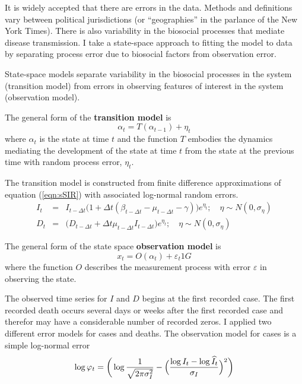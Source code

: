 \documentclass[12pt,letterpaper]{article}
\begin{document}
It is widely accepted that there are errors in the data. Methods and
definitions vary
between political jurisdictions (or ``geographies'' in the parlance of
the New York Times). There is also variability in the biosocial
processes that mediate disease transmission.
I take a state-space approach to fitting the model to data by
separating process error due to biosocial factors from observation
error. 

State-space models separate variability in the biosocial
processes in the system (transition model)
from errors in observing features of interest
in the system (observation model).

The general form of the {\bf transition model} is
\begin{displaymath}
\alpha_t=T(\alpha_{t-1}) + \eta_t
\end{displaymath}
where $\alpha_t$ is the state at time $t$ and 
the function $T$ embodies the dynamics mediating the
development of the state at time $t$ from the state at the previous
time with random process error, $\eta_t$.

The transition model is constructed from finite difference
approximations of equation (\ref{eqn:sSIR}) with associated log-normal
random errors.
\begin{eqnarray}
\label{eqn:sSIRfd}
I_t &=& I_{t-\Delta t}\big(1+\Delta t(\beta_{t-\Delta t} - \mu_{t-\Delta t}
- \gamma)\big)e^{\eta_t} ;\quad\eta\sim N(0,\sigma_\eta) \\ 
D_t &=& \big(D_{t-\Delta t} + \Delta t \mu_{t-\Delta t}I_{t-\Delta
t}\big)e^{\eta_t};\quad\eta\sim N(0,\sigma_\eta)
\end{eqnarray}

The general form of the state space {\bf observation model} is
\begin{displaymath}
x_t = O(\alpha_t) + \varepsilon_t1G
\end{displaymath}
where the function $O$ describes the measurement process with
error $\varepsilon$ in observing the state.

The observed time series for $I$ and $D$ begins at the first recorded
case. The first recorded death occurs several days or weeks after the
first recorded case and therefor may have a considerable number of
recorded zeros. I applied two different error models for cases and
deaths. The observation model for cases is a simple log-normal error
\begin{equation}
\log\varphi_t = \bigg(\log\frac{1}{\sqrt{2\pi\sigma^2_I}} -\Bigl(\frac{\log
I_t-\log\widehat{I}_t}{\sigma_I}\Bigr)^2\bigg)\\
\end{equation}
\end{document}
